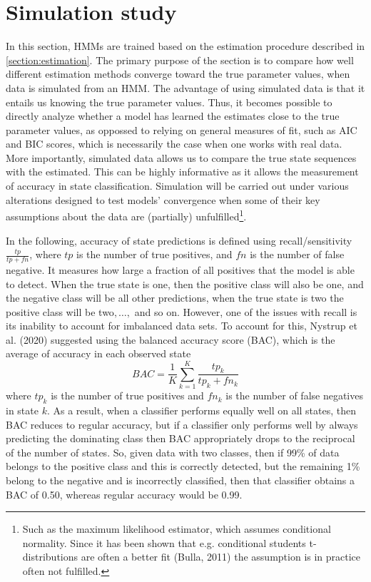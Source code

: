 \newpage

\section{Simulation study}
In this section, HMMs are trained based on the estimation procedure described in \cref{section:estimation}. The primary purpose of the section is to compare how well different estimation methods converge toward the true parameter values, when data is simulated from an HMM. The advantage of using simulated data is that it entails us knowing the true parameter values. Thus, it becomes possible to directly analyze whether a model has learned the estimates close to the true parameter values, as oppossed to relying on general measures of fit, such as AIC and BIC scores, which is necessarily the case when one works with real data. More importantly, simulated data allows us to compare the true state sequences with the estimated. This can be highly informative as it allows the measurement of accuracy in state classification. Simulation will be carried out under various alterations designed to test models' convergence when some of their key assumptions about the data are (partially) unfulfilled\footnote
{Such as the maximum likelihood estimator, which assumes conditional normality. Since it has been shown that e.g. conditional students t-distributions are often a better fit (Bulla, 2011) the assumption is in practice often not fulfilled.
}.

In the following, accuracy of state predictions is defined using recall/sensitivity $\frac{tp}{tp+fn}$, where $tp$ is the number of true positives, and $fn$ is the number of false negative. It measures how large a fraction of all positives that the model is able to detect. When the true state is one, then the positive class will also be one, and the negative class will be all other predictions, when the true state is two the positive class will be two$,\ldots,$ and so on. However, one of the issues with recall is its inability to account for imbalanced data sets. To account for this, Nystrup et al. (2020) suggested using the balanced accuracy score (BAC), which is the average of accuracy in each observed state
\begin{equation}
    BAC = \frac{1}{K} \sum_{k=1}^K \frac{tp_k}{tp_k + fn_k}
\end{equation}
where $tp_k$ is the number of true positives and $fn_k$ is the number of false negatives in state $k$. As a result, when a classifier performs equally well on all states, then BAC reduces to regular accuracy, but if a classifier only performs well by always predicting the dominating class then BAC appropriately drops to the reciprocal of the number of states. So, given data with two classes, then if 99\% of data belongs to the positive class and this is correctly detected, but the remaining 1\% belong to the negative and is incorrectly classified, then that classifier obtains a BAC of 0.50, whereas regular accuracy would be 0.99.

